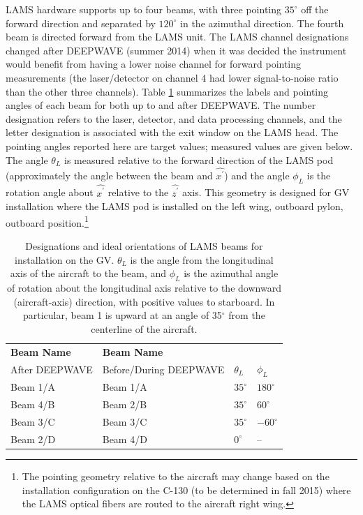 \documentclass[12pt,twoside,english]{article}\usepackage[]{graphicx}\usepackage[]{color}
\providecommand{\tabularnewline}{\\}
\let\OrgIndex\index
\renewcommand*{\index}[1]{\OrgIndex{#1}}
\begin{document}
LAMS hardware supports up to four  beams, with three pointing $35^{\circ}$ off the forward direction and separated by $120^{\circ}$ in the azimuthal direction. The fourth beam is directed forward from the LAMS unit. The LAMS channel designations changed after DEEPWAVE (summer 2014) when it was decided the instrument would benefit from having a lower noise channel for forward pointing measurements (the laser/detector on channel 4 had lower signal-to-noise ratio than the other three channels). Table \ref{tab:BeamConfig} summarizes the labels and pointing angles of each beam for both up to and after DEEPWAVE. The number designation refers to the laser, detector, and data processing channels, and the letter designation is associated with the exit window on the LAMS head. The pointing angles reported here are target values; measured values are given below. The angle $\theta_L$ is measured relative to the forward direction of the LAMS pod (approximately the angle between the beam and $\hat{x^{\prime}}$) and the angle $\phi_L$ is the rotation angle about $\hat{x^{\prime}}$ relative to the $\hat{z^{\prime}}$ axis. This geometry is designed for GV installation where the LAMS pod is installed on the left wing, outboard pylon, outboard position.\footnote{The pointing geometry relative to the aircraft may change based on the installation configuration on the C-130 (to be determined in fall 2015) where the LAMS optical fibers are routed to the aircraft right wing.}

\begin{table}
\begin{minipage}[t]{0.93\columnwidth}%
\begin{center}
\begin{tabular}{>{\centering}p{3.5cm}>{\centering}p{3.5cm}>{\centering}p{2.5cm}>{\centering}p{2.5cm}}
\toprule 
\textbf{Beam Name} &
\textbf{Beam Name} &
 &
\tabularnewline
After DEEPWAVE &
Before/During DEEPWAVE &
\textbf{$\theta_{L}$}  &
\textbf{$\phi_{L}$} \tabularnewline
\midrule 
Beam 1/A  &
Beam 1/A  &
$35^{\circ}$  &
$180^{\circ}$ \tabularnewline
\midrule 
Beam 4/B  &
Beam 2/B  &
$35^{\circ}$  &
$60^{\circ}$ \tabularnewline
\midrule 
Beam 3/C  &
Beam 3/C  &
$35^{\circ}$  &
$-60^{\circ}$ \tabularnewline
\midrule 
Beam 2/D  &
Beam 4/D  &
$0^{\circ}$  &
-- \tabularnewline
\bottomrule
\end{tabular}
\par\end{center}%
\end{minipage}
\protect\caption[Designations and ideal orientations of LAMS beams for installation on the GV.]{Designations and ideal orientations of LAMS beams for installation
on the GV. $\theta_{L}$ is the angle from the longitudinal axis of
the aircraft to the beam, and $\phi_{L}$ is the azimuthal angle of
rotation about the longitudinal axis relative to the downward (aircraft-axis)
direction, with positive values to starboard. In particular, beam
1 is upward at an angle of 35$^{\circ}$ from the centerline of the
aircraft.\label{tab:BeamConfig}}
\end{table}
\end{document}
